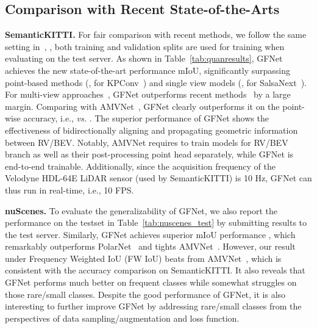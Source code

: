 \subsection{Comparison with Recent State-of-the-Arts}

\textbf{SemanticKITTI.} For fair comparison with recent  methods, we follow the same setting in~\cite{behley2019semantickitti,kochanov2020kprnet}, \ie, both training and validation splits are used for training when evaluating on the test server. As shown in Table~\ref{tab:quanresults}, GFNet achieves the new state-of-the-art performance  mIoU, significantly surpassing point-based methods (\eg,  for KPConv~\citep{thomas2019kpconv}) and single view models (\eg,  for SalsaNext~\citep{cortinhal2020salsanext}). For multi-view approaches~\citep{alnaggar2021multi,chen2020mvlidarnet,gerdzhev2021tornado,liong2020amvnet}, GFNet outperforms recent methods~\cite{alnaggar2021multi,chen2020mvlidarnet,gerdzhev2021tornado} by a large margin. Comparing with AMVNet~\cite{liong2020amvnet}, GFNet clearly outperforms it on the point-wise accuracy, i.e.,  \textit{vs.} . The superior performance of GFNet shows the effectiveness of bidirectionally aligning and propagating geometric information between RV/BEV.
Notably, AMVNet requires to train models for RV/BEV branch as well as their post-processing point head separately, while GFNet is end-to-end trainable. 
Additionally, since the acquisition frequency of the Velodyne HDL-64E LiDAR sensor (used by SemanticKITTI) is 10 Hz, GFNet can thus run in real-time, i.e., 10 FPS.

\textbf{nuScenes.} To evaluate the generalizability of GFNet, we also report the performance on the testset in Table~\ref{tab:nuscenes_test} by submitting results to the test server. Similarly, GFNet achieves superior mIoU performance , which remarkably outperforms PolarNet~\citep{zhang2020polarnet} and tights AMVNet~\citep{liong2020amvnet}. However, our result  under Frequency Weighted IoU (FW IoU) beats  from AMVNet~\citep{liong2020amvnet}, which is consistent with the accuracy comparison on SemanticKITTI. It also reveals that GFNet performs much better on frequent classes while somewhat struggles on those rare/small classes. Despite the good performance of GFNet, it is also interesting to further improve  GFNet by addressing rare/small classes from the perspectives of data sampling/augmentation and loss function.

